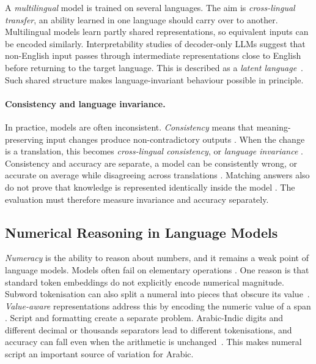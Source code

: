 A \emph{multilingual} model is trained on several languages. The aim is \emph{cross-lingual transfer},
an ability learned in one language should carry over to another. Multilingual models learn partly
shared representations, so equivalent inputs can be encoded similarly. Interpretability studies of
decoder-only LLMs suggest that non-English input passes through intermediate representations close to
English before returning to the target language. This is described as a \emph{latent
language}~\cite{wendler2024llamasworkenglishlatent,schut2025multilingualllmsthinkenglish}. Such shared
structure makes language-invariant behaviour possible in principle.

\paragraph{Consistency and language invariance.}
In practice, models are often inconsistent. \emph{Consistency} means that meaning-preserving input
changes produce non-contradictory outputs
\cite{elazar2021measuringimprovingconsistencypretrained}. When the change is a translation, this becomes
\emph{cross-lingual consistency}, or \emph{language invariance}
\cite{Fierro_2022,Qi_2023}. Consistency and accuracy are separate, a model can be consistently wrong,
or accurate on average while disagreeing across translations
\cite{elazar2021measuringimprovingconsistencypretrained,Qi_2023}. Matching answers also do not prove
that knowledge is represented identically inside the model
\cite{ifergan2024beneathsurfaceconsistencyexploring}. The evaluation must therefore measure invariance
and accuracy separately.

\subsection{Numerical Reasoning in Language Models}
\label{subsec:bg-numeracy}

\emph{Numeracy} is the ability to reason about numbers, and it remains a weak point of language
models. Models often fail on elementary operations
\cite{rahman2025fragilenumbersenseprobing,wallace2019nlpmodelsknownumbers}. One reason is that standard
token embeddings do not explicitly encode numerical magnitude. Subword tokenisation can also split a
numeral into pieces that obscure its value~\cite{wallace2019nlpmodelsknownumbers}. \emph{Value-aware}
representations address this by encoding the numeric value of a span
\cite{dutulescu2026valueawarenumericalrepresentationstransformer,schwartz2024numerologicnumberencodingenhanced}.
Script and formatting create a separate problem. Arabic-Indic digits and different decimal or
thousands separators lead to different tokenisations, and accuracy can fall even when the arithmetic
is unchanged~\cite{reddy2026effectscriptsformatsllm,bhattacharya2025investigatinginteractionlinguisticmathematical}.
This makes numeral script an important source of variation for Arabic.

